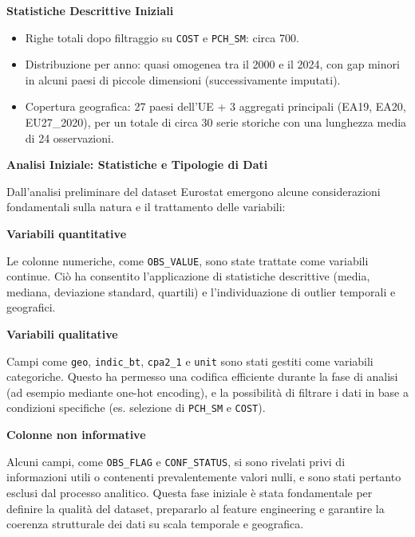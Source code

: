 \documentclass[conference]{IEEEtran}
\begin{document}
\vspace{1em} \noindent\textbf{Statistiche Descrittive Iniziali} \begin{itemize} \item Righe totali dopo filtraggio su \texttt{COST} e \texttt{PCH\_SM}: circa 700. \item Distribuzione per anno: quasi omogenea tra il 2000 e il 2024, con gap minori in alcuni paesi di piccole dimensioni (successivamente imputati). \item Copertura geografica: 27 paesi dell’UE + 3 aggregati principali (EA19, EA20, EU27\_2020), per un totale di circa 30 serie storiche con una lunghezza media di 24 osservazioni. \end{itemize}

\vspace{1em} \noindent\textbf{Analisi Iniziale: Statistiche e Tipologie di Dati} 

Dall’analisi preliminare del dataset Eurostat emergono alcune considerazioni fondamentali sulla natura e il trattamento delle variabili:

\vspace{1em}\noindent\textbf{Variabili quantitative}

Le colonne numeriche, come \texttt{OBS\_VALUE}, sono state trattate come variabili continue. Ciò ha consentito l’applicazione di statistiche descrittive (media, mediana, deviazione standard, quartili) e l’individuazione di outlier temporali e geografici.

\vspace{1em}\noindent\textbf{Variabili qualitative}

Campi come \texttt{geo}, \texttt{indic\_bt}, \texttt{cpa2\_1} e \texttt{unit} sono stati gestiti come variabili categoriche. Questo ha permesso una codifica efficiente durante la fase di analisi (ad esempio mediante one-hot encoding), e la possibilità di filtrare i dati in base a condizioni specifiche (es. selezione di \texttt{PCH\_SM} e \texttt{COST}).

\vspace{1em}\noindent\textbf{Colonne non informative}

Alcuni campi, come \texttt{OBS\_FLAG} e \texttt{CONF\_STATUS}, si sono rivelati privi di informazioni utili o contenenti prevalentemente valori nulli, e sono stati pertanto esclusi dal processo analitico.
Questa fase iniziale è stata fondamentale per definire la qualità del dataset, prepararlo al feature engineering e garantire la coerenza strutturale dei dati su scala temporale e geografica.
\end{document}
